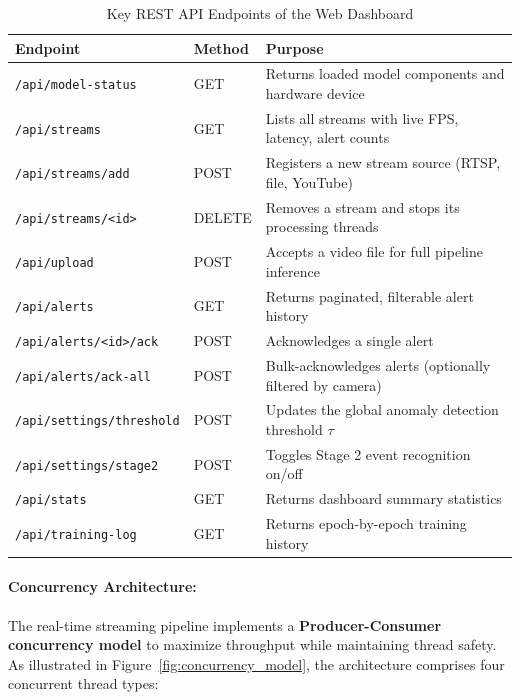 \documentclass[12pt]{article}
\begin{document}
\begin{table}[H]
    \centering
    \caption{Key REST API Endpoints of the Web Dashboard}
    \label{tab:api_endpoints}
    \small
    \begin{tabular}{llp{6cm}}
        \toprule
        \textbf{Endpoint} & \textbf{Method} & \textbf{Purpose} \\
        \midrule
        \texttt{/api/model-status} & GET & Returns loaded model components and hardware device \\
        \texttt{/api/streams} & GET & Lists all streams with live FPS, latency, alert counts \\
        \texttt{/api/streams/add} & POST & Registers a new stream source (RTSP, file, YouTube) \\
        \texttt{/api/streams/<id>} & DELETE & Removes a stream and stops its processing threads \\
        \texttt{/api/upload} & POST & Accepts a video file for full pipeline inference \\
        \texttt{/api/alerts} & GET & Returns paginated, filterable alert history \\
        \texttt{/api/alerts/<id>/ack} & POST & Acknowledges a single alert \\
        \texttt{/api/alerts/ack-all} & POST & Bulk-acknowledges alerts (optionally filtered by camera) \\
        \texttt{/api/settings/threshold} & POST & Updates the global anomaly detection threshold $\tau$ \\
        \texttt{/api/settings/stage2} & POST & Toggles Stage 2 event recognition on/off \\
        \texttt{/api/stats} & GET & Returns dashboard summary statistics \\
        \texttt{/api/training-log} & GET & Returns epoch-by-epoch training history \\
        \bottomrule
    \end{tabular}
\end{table}

\paragraph{Concurrency Architecture:}
The real-time streaming pipeline implements a \textbf{Producer-Consumer concurrency model} to maximize throughput while maintaining thread safety. As illustrated in Figure~\ref{fig:concurrency_model}, the architecture comprises four concurrent thread types:
\end{document}
